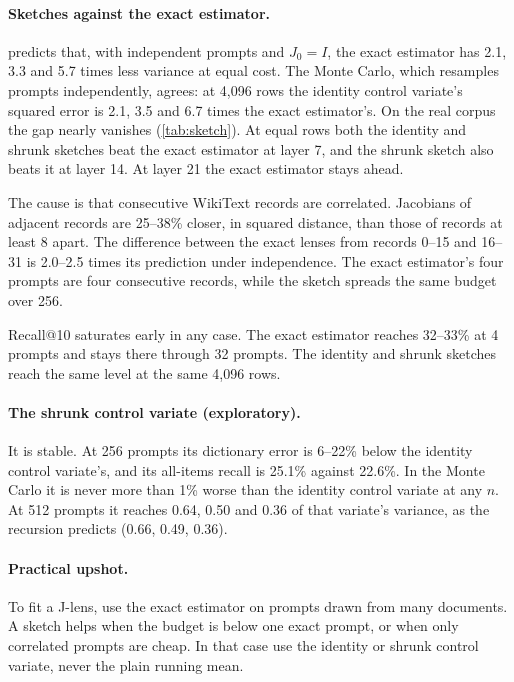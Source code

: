 \documentclass[11pt]{article}
\theoremstyle{definition}
\begin{document}
\paragraph{Sketches against the exact estimator.}  predicts that, with independent
prompts and $J_0=I$, the exact estimator has 2.1, 3.3 and 5.7 times less variance at equal cost. The
Monte Carlo, which resamples prompts independently, agrees: at 4,096 rows the identity control
variate's squared error is 2.1, 3.5 and 6.7 times the exact estimator's. On the real corpus the gap
nearly vanishes (\cref{tab:sketch}). At equal rows both the identity and shrunk sketches beat the exact
estimator at layer 7, and the shrunk sketch also beats it at layer 14. At layer 21 the exact estimator
stays ahead.

The cause is that consecutive WikiText records are correlated. Jacobians of adjacent records are
25--38\% closer, in squared distance, than those of records at least 8 apart. The difference between
the exact lenses from records 0--15 and 16--31 is 2.0--2.5 times its prediction under independence.
The exact estimator's four prompts are four consecutive records, while the sketch spreads the same
budget over 256.

Recall@10 saturates early in any case. The exact estimator reaches 32--33\% at 4 prompts and stays
there through 32 prompts. The identity and shrunk sketches reach the same level at the same 4,096
rows.

\paragraph{The shrunk control variate (exploratory).} It is stable. At 256 prompts its dictionary
error is 6--22\% below the identity control variate's, and its all-items recall is 25.1\% against
22.6\%. In the Monte Carlo it is never more than 1\% worse than the identity control variate at any
$n$. At 512 prompts it reaches 0.64, 0.50 and 0.36 of that variate's variance, as the recursion
predicts (0.66, 0.49, 0.36).

\paragraph{Practical upshot.} To fit a J-lens, use the exact estimator on prompts drawn from many
documents. A sketch helps when the budget is below one exact prompt, or when only correlated prompts
are cheap. In that case use the identity or shrunk control variate, never the plain running mean.
\end{document}
